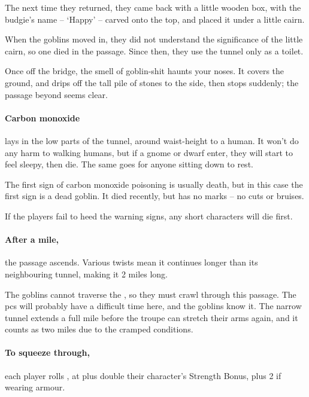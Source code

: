 \begin{multicols}{2}
\begin{exampletext}
  The next time they returned, they came back with a little wooden box, with the budgie's name -- `Happy' -- carved onto the top, and placed it under a little cairn.

  When the goblins moved in, they did not understand the significance of the little cairn, so one died in the passage.
  Since then, they use the tunnel only as a toilet.
\end{exampletext}

\begin{boxtext}
  Once off the bridge, the smell of goblin-shit haunts your noses.
  It covers the ground, and drips off the tall pile of stones to the side, then stops suddenly; the passage beyond seems clear.
\end{boxtext}

\paragraph{Carbon monoxide}
lays in the low parts of the tunnel, around waist-height to a human.
It won't do any harm to walking humans, but if a gnome or dwarf enter, they will start to feel sleepy, then die.
The same goes for anyone sitting down to rest.

The first sign of carbon monoxide poisoning is usually death, but in this case the first sign is a dead goblin.
It died recently, but has no marks -- no cuts or bruises.

If the players fail to heed the warning signs, any short characters will die first.

\paragraph{After a mile,}
the passage ascends.
Various twists mean it continues longer than its neighbouring tunnel, making it 2 miles long.


The goblins cannot traverse the , so they must crawl through this passage.
The \glspl{pc} will probably have a difficult time here, and the goblins know it.
The narrow tunnel extends a full mile before the troupe can stretch their arms again, and it counts as two miles due to the cramped conditions.

\paragraph{To squeeze through,}
each player rolls , at \tn[7] plus double their character's Strength Bonus, plus 2 if wearing armour.


\end{multicols}
